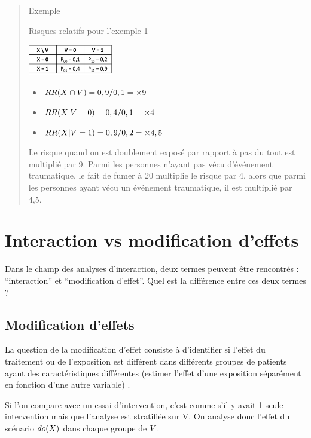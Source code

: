 \documentclass[
]{book}
\providecommand{\tightlist}{%
  \setlength{\itemsep}{0pt}\setlength{\parskip}{0pt}}
\begin{document}
\begin{quote}
Exemple

Risques relatifs pour l'exemple 1

\includegraphics[width=0.3\textwidth,height=\textheight]{img/Image1.png}

\begin{itemize}
\tightlist
\item
  \(\small RR(X \cap V) = 0,9/0,1 = \times 9\)
\item
  \(\small RR(X | V=0) = 0,4/0,1 = \times 4\)
\item
  \(\small RR(X | V=1) = 0,9/0,2 = \times 4,5\)
\end{itemize}

Le risque quand on est doublement exposé par rapport à pas du tout est multiplié par 9. Parmi les personnes n'ayant pas vécu d'événement traumatique, le fait de fumer à 20 multiplie le risque par 4, alors que parmi les personnes ayant vécu un événement traumatique, il est multiplié par 4,5.
\end{quote}

\hypertarget{interaction-vs-modification-deffets}{%
\chapter{Interaction vs modification d'effets}\label{interaction-vs-modification-deffets}}

Dans le champ des analyses d'interaction, deux termes peuvent être rencontrés : ``interaction'' et ``modification d'effet''. Quel est la différence entre ces deux termes ?

\hypertarget{modification-deffets}{%
\section{Modification d'effets}\label{modification-deffets}}

La question de la modification d'effet consiste à d'identifier si l'effet du traitement ou de l'exposition est différent dans différents groupes de patients ayant des caractéristiques différentes (estimer l'effet d'une exposition séparément en fonction d'une autre variable) \citet{corraini_effect_2017}.

Si l'on compare avec un essai d'intervention, c'est comme s'il y avait 1 seule intervention mais que l'analyse est stratifiée sur V. On analyse donc l'effet du scénario \(\small do(X)\) dans chaque groupe de \(\small V\).
\end{document}
